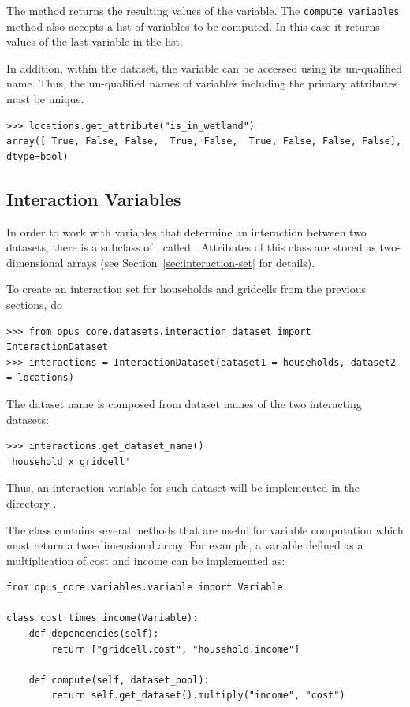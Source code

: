 The method returns the resulting values of the variable. The
\verb|compute_variables| method also accepts a list of variables to be
computed.  In this case it returns values of the last variable in the list.

 In addition, within the dataset, the variable can be accessed using its un-qualified name.
 Thus, the un-qualified names of variables including the primary
 attributes must be unique.
\begin{verbatim}
>>> locations.get_attribute("is_in_wetland")
array([ True, False, False,  True, False,  True, False, False, False], dtype=bool)
\end{verbatim}

\subsection{Interaction Variables}
\label{sec:interactions}

In order to work with variables \variablesindex that determine an
interaction between two datasets, \datasetindex there is a subclass of
, called
. Attributes of this class are stored as
two-dimensional arrays (see Section~\ref{sec:interaction-set} for details).

To create an interaction set for households and gridcells from the previous
sections, do
\begin{verbatim}
>>> from opus_core.datasets.interaction_dataset import InteractionDataset
>>> interactions = InteractionDataset(dataset1 = households, dataset2 = locations)
\end{verbatim}
The dataset name is composed from dataset names of the two interacting datasets: \datasetindex
\begin{verbatim}
>>> interactions.get_dataset_name()
'household_x_gridcell'
\end{verbatim}
Thus, an interaction variable \variablesindex for such dataset \datasetindex will be implemented in the
directory .

The  class contains several methods that are useful for
variable \variablesindex computation which must return a two-dimensional array. For example, a
variable \variablesindex defined as a multiplication of cost and income can be implemented as:
\variablesindex
\begin{verbatim}
from opus_core.variables.variable import Variable

class cost_times_income(Variable):
    def dependencies(self):
        return ["gridcell.cost", "household.income"]

    def compute(self, dataset_pool):
        return self.get_dataset().multiply("income", "cost")
\end{verbatim}


